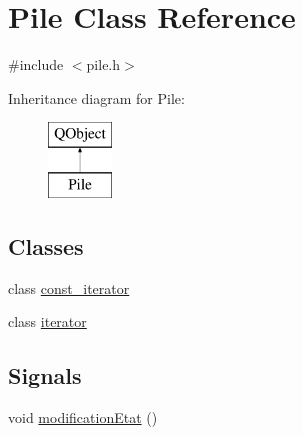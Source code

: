 \hypertarget{class_pile}{}\section{Pile Class Reference}
\label{class_pile}


{\ttfamily \#include $<$pile.\+h$>$}

Inheritance diagram for Pile\+:\begin{figure}[H]
\begin{center}
\leavevmode
\includegraphics[height=2.000000cm]{class_pile}
\end{center}
\end{figure}
\subsection*{Classes}
\begin{DoxyCompactItemize}
\item 
class \hyperlink{class_pile_1_1const__iterator}{const\+\_\+iterator}
\item 
class \hyperlink{class_pile_1_1iterator}{iterator}
\end{DoxyCompactItemize}
\subsection*{Signals}
\begin{DoxyCompactItemize}
\item 
void \hyperlink{class_pile_ac55a0afb626baffd1019567cbaa7f4b2}{modification\+Etat} ()
\end{DoxyCompactItemize}
